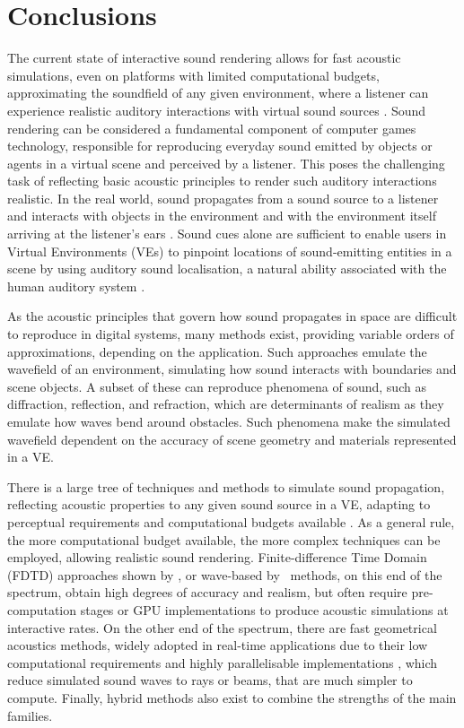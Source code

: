 \section{Conclusions}
The current state of interactive sound rendering allows for fast acoustic simulations, even on platforms with limited computational budgets, approximating the soundfield of any given environment, where a listener can experience realistic auditory interactions with virtual sound sources \citep{lakka2018spatial, hulusic2012acoustic}. Sound rendering can be considered a fundamental component of computer games technology, responsible for reproducing everyday sound emitted by objects or agents in a virtual scene and perceived by a listener. This poses the challenging task of reflecting basic acoustic principles to render such auditory interactions realistic. In the real world, sound propagates from a sound source to a listener and interacts with objects in the environment and with the environment itself arriving at the listener's ears \citep{kuttruff2016room}. Sound cues alone are sufficient to enable users in Virtual Environments (VEs) to pinpoint locations of sound-emitting entities in a scene by using auditory sound localisation, a natural ability associated with the human auditory system \citep{lokki2005navigation, rubio2017immersive}.\par
As the acoustic principles that govern how sound propagates in space are difficult to reproduce in digital systems, many methods exist, providing variable orders of approximations, depending on the application. Such approaches emulate the wavefield of an environment, simulating how sound interacts with boundaries and scene objects. A subset of these can reproduce phenomena of sound, such as diffraction, reflection, and refraction, which are determinants of realism as they emulate how waves bend around obstacles. Such phenomena make the simulated wavefield dependent on the accuracy of scene geometry and materials represented in a VE. \par
There is a large tree of techniques and methods to simulate sound propagation, reflecting acoustic properties to any given sound source in a VE, adapting to perceptual requirements and computational budgets available \cite{doukakis2019audio}. As a general rule, the more computational budget available, the more complex techniques can be employed, allowing realistic sound rendering. Finite-difference Time Domain (FDTD) approaches shown by \cite{hamilton2017fdtd}, or wave-based by~\cite{raghuvanshi2014parametric} methods, on this end of the spectrum, obtain high degrees of accuracy and realism, but often require pre-computation stages or GPU implementations to produce acoustic simulations at interactive rates. On the other end of the spectrum, there are fast geometrical acoustics methods, widely adopted in real-time applications due to their low computational requirements and highly parallelisable implementations \citep{cowan2010gpu}, which reduce simulated sound waves to rays or beams, that are much simpler to compute. Finally, hybrid methods also exist to combine the strengths of the main families. \par
